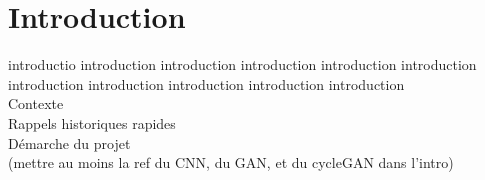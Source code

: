\chapter*{Introduction}


introductio introduction introduction introduction introduction introduction  introduction  introduction  introduction  introduction  introduction \\
Contexte\\
Rappels historiques rapides\\
Démarche du projet\\
(mettre au moins la ref du CNN, du GAN, et du cycleGAN dans l'intro)\\
